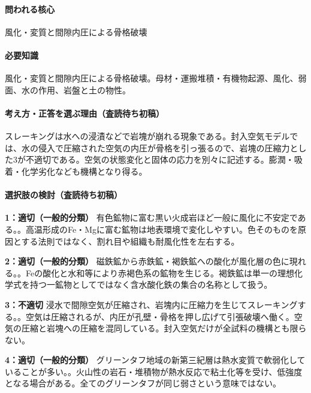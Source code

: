 \paragraph{問われる核心} 風化・変質と間隙内圧による骨格破壊

\paragraph{必要知識} 風化・変質と間隙内圧による骨格破壊。母材・運搬堆積・有機物起源、風化、弱面、水の作用、岩盤と土の物性。

\paragraph{考え方・正答を選ぶ理由（査読待ち初稿）} スレーキングは水への浸漬などで岩塊が崩れる現象である。封入空気モデルでは、水の侵入で圧縮された空気の内圧が骨格を引っ張るので、岩塊の圧縮力とした3が不適切である。空気の状態変化と固体の応力を別々に記述する。膨潤・吸着・化学劣化なども機構となり得る。

\paragraph{選択肢の検討（査読待ち初稿）}\mbox{}\par

\noindent\textbf{1：適切（一般的分類）} 有色鉱物に富む黒い火成岩ほど一般に風化に不安定である。。高温形成のFe・Mgに富む鉱物は地表環境で変化しやすい。色そのものを原因とする法則ではなく、割れ目や組織も耐風化性を左右する。\par

\noindent\textbf{2：適切（一般的分類）} 磁鉄鉱から赤鉄鉱・褐鉄鉱への酸化が風化層の色に現れる。。Feの酸化と水和等により赤褐色系の鉱物を生じる。褐鉄鉱は単一の理想化学式を持つ一鉱物としてではなく含水酸化鉄の集合の名称として扱う。\par

\noindent\textbf{3：不適切} 浸水で間隙空気が圧縮され、岩塊内に圧縮力を生じてスレーキングする。。空気は圧縮されるが、内圧が孔壁・骨格を押し広げて引張破壊へ働く。空気の圧縮と岩塊への圧縮を混同している。封入空気だけが全試料の機構とも限らない。\par

\noindent\textbf{4：適切（一般的分類）} グリーンタフ地域の新第三紀層は熱水変質で軟弱化していることが多い。。火山性の岩石・堆積物が熱水反応で粘土化等を受け、低強度となる場合がある。全てのグリーンタフが同じ弱さという意味ではない。\par

